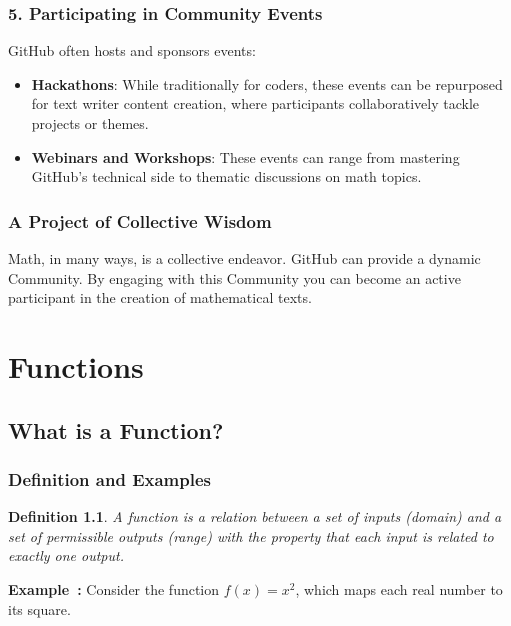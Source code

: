 \documentclass[a4paper,12pt]{book}
\newcounter{example}
\newenvironment{example}[1][\theexample]
  {\refstepcounter{example}\par\medskip\noindent\textbf{Example~#1:} \rmfamily}
  {\medskip}
\newtheorem{definition}{Definition}
\begin{document}
\subsection*{5. Participating in Community Events}
GitHub often hosts and sponsors events:

\begin{itemize}
    \item \textbf{Hackathons}: While traditionally for coders, these events can be repurposed for text writer content creation, where participants collaboratively tackle projects or themes.
    \item \textbf{Webinars and Workshops}: These events can range from mastering GitHub's technical side to thematic discussions on math topics.
\end{itemize}

\subsection*{A Project of Collective Wisdom}
Math, in many ways, is a collective endeavor. GitHub can provide a dynamic Community. By engaging with this Community you can become an active participant in the creation of mathematical texts.

\chapter{Functions}
\section{What is a Function?}
\subsection{Definition and Examples}
\begin{definition}
A function is a relation between a set of inputs (domain) and a set of permissible outputs (range) with the property that each input is related to exactly one output.
\end{definition}

\begin{example}
Consider the function \( f(x) = x^2 \), which maps each real number to its square.
\end{example}

\end{document}
